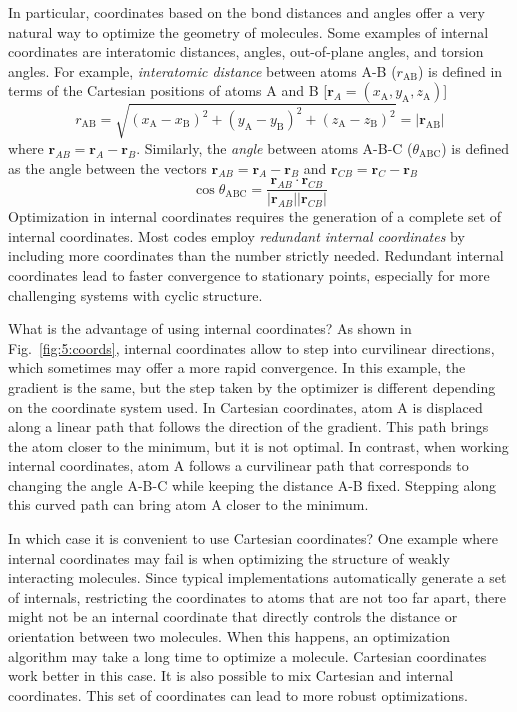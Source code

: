 \documentclass[../Main/notes.tex]{subfiles}
\begin{document}
In particular, coordinates based on the bond distances and angles offer a very natural way to optimize the geometry of molecules.
Some examples of internal coordinates are interatomic distances, angles, out-of-plane angles, and torsion angles.
For example, \emph{interatomic distance} between atoms A-B ($r_{\mathrm{AB}}$) is defined in terms of the Cartesian positions of atoms A and B [$\mathbf{r}_{A} = (x_\mathrm{A},y_\mathrm{A},z_\mathrm{A})$]
\begin{equation}
r_{\mathrm{AB}} =
\sqrt{
(x_\mathrm{A} - x_\mathrm{B})^2
+ (y_\mathrm{A} - y_\mathrm{B})^2
+ (z_\mathrm{A} - z_\mathrm{B})^2
}
= |\mathbf{r}_{\mathrm{AB}}|
\end{equation}
where $\mathbf{r}_{AB} = \mathbf{r}_{A} - \mathbf{r}_{B}$.
Similarly, the \emph{angle} between atoms A-B-C ($\theta_{\mathrm{ABC}}$) is defined as the angle between the vectors $\mathbf{r}_{AB} = \mathbf{r}_{A} - \mathbf{r}_{B}$ and $\mathbf{r}_{CB} = \mathbf{r}_{C} - \mathbf{r}_{B}$
\begin{equation}
\cos \theta_{\mathrm{ABC}}
= \frac{\mathbf{r}_{AB} \cdot \mathbf{r}_{CB}}
{|\mathbf{r}_{AB}||\mathbf{r}_{CB}|}
\end{equation}
Optimization in internal coordinates requires the generation of a complete set of internal coordinates.
Most codes employ \emph{redundant internal coordinates} by including more coordinates than the number strictly needed.
Redundant internal coordinates lead to faster convergence to stationary points, especially for more challenging systems with cyclic structure.

What is the advantage of using internal coordinates? As shown in Fig.~\ref{fig:5:coords}, internal coordinates allow to step into  curvilinear directions, which sometimes may offer a more rapid convergence.
In this example, the gradient is the same, but the step taken by the optimizer is different depending on the coordinate system used.
In Cartesian coordinates, atom A is displaced along a linear path that follows the direction of the gradient. This path brings the atom closer to the minimum, but it is not optimal.
In contrast, when working internal coordinates, atom A follows a curvilinear path that corresponds to changing the angle A-B-C while keeping the distance A-B fixed.
Stepping along this curved path can bring atom A closer to the minimum.

In which case it is convenient to use Cartesian coordinates?
One example where internal coordinates may fail is when optimizing the structure of weakly interacting molecules.
Since typical implementations automatically generate a set of internals, restricting the coordinates to atoms that are not too far apart, there might not be an internal coordinate that directly controls the distance or orientation between two molecules.
When this happens, an optimization algorithm may take a long time to optimize a molecule.
Cartesian coordinates work better in this case.
It is also possible to mix Cartesian and internal coordinates.
This set of coordinates can lead to more robust optimizations.
\end{document}
